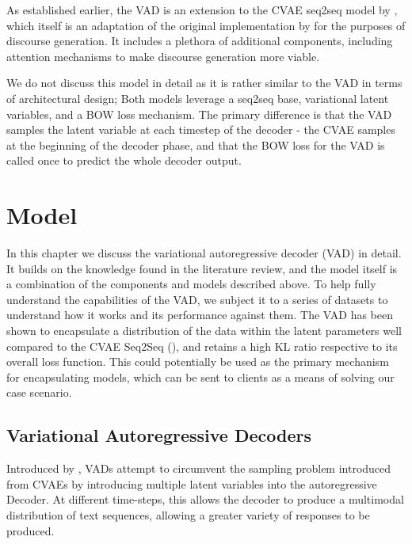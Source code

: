 \documentclass[12pt,twoside]{report}
\begin{document}
As established earlier, the VAD is an extension to the CVAE seq2seq model by \cite{zhao_learning_2017}, which itself is an adaptation of the original implementation by \cite{bowman_generating_2015} for the purposes of discourse generation. It includes a plethora of additional components, including attention mechanisms to make discourse generation more viable.

We do not discuss this model in detail as it is rather similar to the VAD in terms of architectural design; Both models leverage a seq2seq base, variational latent variables, and a BOW loss mechanism. The primary difference is that the VAD samples the latent variable at each timestep of the decoder - the CVAE samples at the beginning of the decoder phase, and that the BOW loss for the VAD is called once to predict the whole decoder output.

\chapter{Model}


In this chapter we discuss the variational autoregressive decoder (VAD) in detail. It builds on the knowledge found in the literature review, and the model itself is a combination of the components and models described above. To help fully understand the capabilities of the VAD, we subject it to a series of datasets to understand how it works and its performance against them. The VAD has been shown to encapsulate a distribution of the data within the latent parameters well compared to the CVAE Seq2Seq (\cite{zhao_learning_2017}), and retains a high KL ratio respective to its overall loss function. This could potentially be used as the primary mechanism for encapsulating models, which can be sent to clients as a means of solving our case scenario.

\section{Variational Autoregressive Decoders}

Introduced by \cite{du_variational_2018}, VADs attempt to circumvent the sampling problem introduced from CVAEs by introducing multiple latent variables into the autoregressive Decoder. At different time-steps, this allows the decoder to produce a multimodal distribution of text sequences, allowing a greater variety of responses to be produced. 
\end{document}
